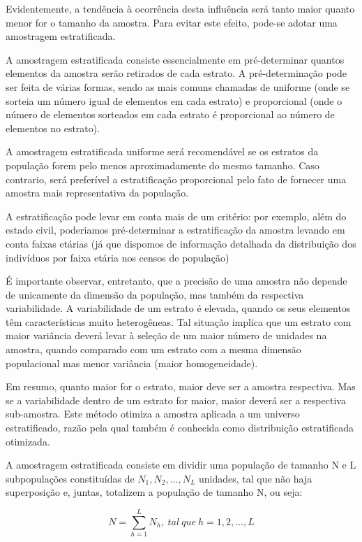 Evidentemente, a tendência à ocorrência desta influência será
tanto maior quanto menor for o tamanho da amostra. Para evitar
este efeito, pode-se adotar uma amostragem estratificada.\vskip0.3cm

A amostragem estratificada consiste essencialmente em
pré-determinar quantos elementos da amostra serão retirados de
cada estrato. A pré-determinação pode ser feita de várias formas,
sendo as mais comuns chamadas de uniforme (onde se sorteia um
número igual de elementos em cada estrato) e proporcional (onde o
número de elementos sorteados em cada estrato é proporcional ao
número de elementos no estrato).\vskip0.3cm

A amostragem estratificada uniforme será recomendável se os
estratos da população forem pelo menos aproximadamente do mesmo
tamanho. Caso contrario, será preferível a estratificação
proporcional pelo fato de fornecer uma amostra mais representativa
da população.\vskip0.3cm

A estratificação pode levar em conta mais de um critério: por
exemplo, além do estado civil, poderiamos pré-determinar a
estratificação da amostra levando em conta faixas etárias (já que
dispomos de informação detalhada da distribuição dos indivíduos
por faixa etária nos censos de população)\vskip0.3cm

É importante observar, entretanto, que a precisão de uma amostra
não depende de unicamente da dimensão da população, mas também da
respectiva variabilidade. A variabilidade de um estrato é elevada,
quando os seus elementos têm características muito heterogêneas.
Tal situação implica que um estrato com maior variância deverá
levar à seleção de um maior número de unidades na amostra, quando
comparado com um estrato com a mesma dimensão populacional mas
menor variância (maior homogeneidade).\vskip0.3cm

Em resumo, quanto maior for o estrato, maior deve ser a amostra
respectiva. Mas se a variabilidade dentro de um estrato for maior,
maior deverá ser a respectiva sub-amostra. Este método otimiza a
amostra aplicada a um universo estratificado, razão pela qual
também é conhecida como distribuição estratificada
otimizada.\vskip0.3cm

\newpage
A amostragem estratificada consiste em dividir uma população de
tamanho N e L subpopulações constituídas de
$N_{1},N_{2},\ldots,N_{L}$ unidades, tal que não haja superposição
e, juntas, totalizem a população de tamanho N, ou seja:

\begin{equation}\label{N}
    N=\sum_{h=1}^{L}N_{h}, \ tal \ que \ h=1,2,\ldots,L
\end{equation}


